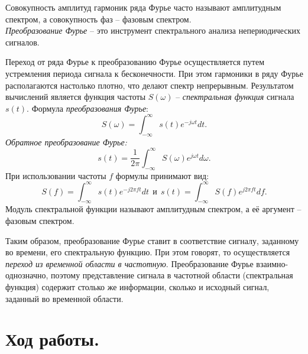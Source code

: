 \documentclass[a4paper,14pt]{extarticle}
\begin{document}
Совокупность амплитуд гармоник ряда Фурье часто называют амплитудным спектром, а совокупность фаз – фазовым спектром. \\

\textit{Преобразование Фурье} -- это инструмент спектрального анализа непериодических сигналов. 

Переход от ряда Фурье к преобразованию Фурье осуществляется путем устремления периода сигнала к бесконечности. При этом гармоники в ряду Фурье располагаются настолько плотно, что делают спектр непрерывным. Результатом вычислений является функция частоты $S(\omega)$ -- \textit{спектральная функция} сигнала $s(t)$. Формула \textit{преобразования Фурье}:
\begin{equation*}
S(\omega) = \int_{-\infty}^{\infty} s(t)e^{-j\omega t} dt.
\end{equation*}
\textit{Обратное преобразование Фурье:}
\begin{equation*}
s(t) = \frac{1}{2\pi} \int_{-\infty}^{\infty} S(\omega)e^{j\omega t} d\omega.
\end{equation*}
При использовании частоты $f$ формулы принимают вид:
\begin{equation*}
S(f) = \int_{-\infty}^{\infty} s(t)e^{-j2\pi ft} dt ~~\text{и} ~~ s(t) = \int_{-\infty}^\infty S(f) e^{j2\pi ft} df.
\end{equation*}
Модуль спектральной функции называют амплитудным спектром, а её аргумент -- фазовым спектром.

Таким образом, преобразование Фурье ставит в соответствие сигналу,
заданному во времени, его спектральную функцию. При этом говорят, то осуществляется \textit{переход из временной области в частотную}. Преобразование Фурье взаимно-однозначно, поэтому представление сигнала в частотной области (спектральная функция) содержит столько же информации, сколько и исходный сигнал, заданный во временной области.

\section{Ход работы.}
\end{document}
